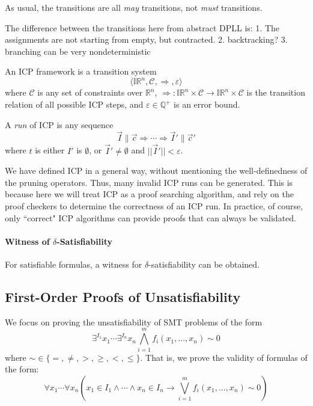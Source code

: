 \documentclass[envcountsect]{llncs}
\begin{document}
As usual, the transitions are all {\em may} transitions, not {\em must}
transitions. 
\begin{remark}
The difference between the transitions here from abstract DPLL is:
1. The assignments are not starting from empty, but contracted.
2. backtracking? 
3. branching can be very nondeterministic
\end{remark}
\begin{definition}
An ICP framework is a transition system 
$$\langle \mathbb{IR}^n, \mathcal{C}, \Longrightarrow, \varepsilon\rangle$$
where $\mathcal{C}$ is any set of constraints over $\mathbb{R}^n$,
$\Longrightarrow: \mathbb{IR}^n\times
\mathcal{C}\rightarrow \mathbb{IR}^n\times \mathcal{C}$ is the transition
relation of all possible ICP steps, and $\varepsilon\in \mathbb{Q}^+$ is an
error bound. 

A {\em run} of ICP is any sequence
$$\vec I \parallel \vec c \Longrightarrow \cdots \Longrightarrow \vec
I'\parallel \vec c'$$
where $t$ is either $I'$ is $\emptyset$, or $\vec I'\neq \emptyset$ and $||\vec
I'||<\varepsilon$.
\end{definition}
\begin{remark}
We have defined ICP in a general way, without mentioning the well-definedness of
the pruning operators. Thus, many invalid ICP runs can be generated. This is
because here we will treat ICP as a proof searching algorithm, and rely on the
proof checkers to determine the correctness of an ICP run. In practice, of
course, only
``correct" ICP algorithms can provide proofs that can always be validated.    
\end{remark}




\paragraph{Witness of $\delta$-Satisfiability}
For satisfiable formulas, a witness for $\delta$-satisfiability can be obtained. 


\subsection{First-Order Proofs of Unsatisfiability}

We focus on proving the unsatisfiability of SMT problems of the form
$$\exists^{I_1} x_1\cdots \exists^{I_n} x_n \bigwedge_{i=1}^m
f_i(x_1,...,x_n)\sim 0$$
where $\sim \in \{=,\neq, >, \geq, <, \leq\}$. That is, we prove the validity
of formulas of the form:
$$\forall x_1 \cdots \forall x_n (x_1\in I_1\wedge \cdots \wedge x_n\in I_n
\rightarrow \bigvee_{i=1}^m f_i(x_1,...,x_n)\sim 0)$$
\end{document}
